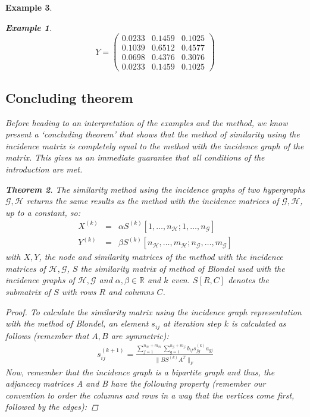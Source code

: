 \documentclass[a4paper,11pt]{report}
\newtheorem{theorem}{Theorem}[section]
\newtheorem{example}[theorem]{Example}
\newcommand{\R}{{\mathbb R}}
\newcommand{\hgraf}{\mathcal{G}}
\newcommand{\hgrafeen}{\mathcal{H}}
\begin{document}
\begin{example}
\begin{example}
    $$Y=\begin{pmatrix}
0.0233&0.1459&0.1025\\
0.1039&0.6512&0.4577\\
0.0698&0.4376&0.3076\\
0.0233&0.1459&0.1025
  \end{pmatrix}$$
  

\end{example}
 \subsection{Concluding theorem}
 Before heading to an interpretation of the examples and the method, we know 
 present a `concluding theorem' that shows that the method of similarity using 
 the incidence matrix is completely equal to the method with the incidence graph 
 of the matrix. This gives us an immediate guarantee that all conditions of the 
 introduction are met.
\begin{theorem}
  The similarity method using the incidence graphs of two hypergraphs $\hgraf, \hgrafeen$ returns the same results as the method with the 
  incidence matrices of $\hgraf, \hgrafeen$, up to a constant, so:
\begin{eqnarray*}
  X^{(k)} &=& \alpha S^{(k)}[1,\ldots,n_\hgrafeen;1,\ldots,n_\hgraf]\\
  Y^{(k)} &=& \beta S^{(k)}[n_\hgrafeen,\ldots, m_\hgrafeen;n_\hgraf,\ldots, m_\hgraf]
\end{eqnarray*}
with $X, Y$, the node and similarity matrices of the method with the incidence matrices of $\hgrafeen, \hgraf$, $S$ the 
similarity matrix of method of Blondel used with the incidence graphs of $\hgrafeen, \hgraf$ 
and $\alpha, \beta \in \R$ and $k$ even. $S[R,C]$ denotes the submatrix of $S$ with rows $R$
 and columns $C$. \end{theorem}
 \begin{proof}
To calculate the similarity matrix using the incidence graph representation with the method of Blondel, an element $s_{ij}$ at iteration step $k$ is calculated as follows
(remember that $A, B$ are symmetric):
\begin{eqnarray}\label{simisimi}
s^{(k+1)}_{ij} = \frac{\sum^{n_\hgrafeen + m_\hgrafeen}_{f=1}\sum^{n_\hgraf + m_\hgraf}_{g=1} b_{if}s^{(k)}_{fg}a_{gj}}{\|BS^{(k)}A^T\|_F}
\end{eqnarray}
Now, remember that the incidence graph is a bipartite graph and thus, the 
adjancecy matrices A and B have the following property (remember our convention to order the columns and rows in a way that the vertices come first, followed by the edges):

\end{proof}
\end{example}
\end{document}
